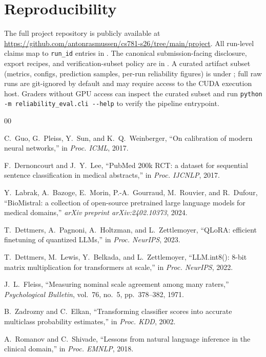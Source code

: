 \documentclass[conference]{IEEEtran}
\begin{document}
\section{Reproducibility}

The full project repository is publicly available at
\url{https://github.com/antonrasmussen/cs781-s26/tree/main/project}.
All run-level claims map to \texttt{run\_id} entries in .
The canonical submission-facing disclosure, export recipes, and verification-subset policy are in .
A curated artifact subset (metrics, configs, prediction samples, per-run reliability figures) is under ; full raw runs are git-ignored by default and may require access to the CUDA execution host.
Graders without GPU access can inspect the curated subset and run \texttt{python -m reliability\_eval.cli -{}-help} to verify the pipeline entrypoint.


\begin{thebibliography}{00}

C.~Guo, G.~Pleiss, Y.~Sun, and K.~Q.~Weinberger,
``On calibration of modern neural networks,''
in \textit{Proc. ICML}, 2017.

F.~Dernoncourt and J.~Y.~Lee,
``PubMed 200k RCT: a dataset for sequential sentence classification in medical abstracts,''
in \textit{Proc. IJCNLP}, 2017.

Y.~Labrak, A.~Bazoge, E.~Morin, P.-A.~Gourraud, M.~Rouvier, and R.~Dufour,
``BioMistral: a collection of open-source pretrained large language models for medical domains,''
\textit{arXiv preprint arXiv:2402.10373}, 2024.

T.~Dettmers, A.~Pagnoni, A.~Holtzman, and L.~Zettlemoyer,
``QLoRA: efficient finetuning of quantized LLMs,''
in \textit{Proc. NeurIPS}, 2023.

T.~Dettmers, M.~Lewis, Y.~Belkada, and L.~Zettlemoyer,
``LLM.int8(): 8-bit matrix multiplication for transformers at scale,''
in \textit{Proc. NeurIPS}, 2022.

J.~L.~Fleiss,
``Measuring nominal scale agreement among many raters,''
\textit{Psychological Bulletin}, vol.~76, no.~5, pp.~378--382, 1971.

B.~Zadrozny and C.~Elkan,
``Transforming classifier scores into accurate multiclass probability estimates,''
in \textit{Proc. KDD}, 2002.

A.~Romanov and C.~Shivade,
``Lessons from natural language inference in the clinical domain,''
in \textit{Proc. EMNLP}, 2018.

\end{thebibliography}
\end{document}

